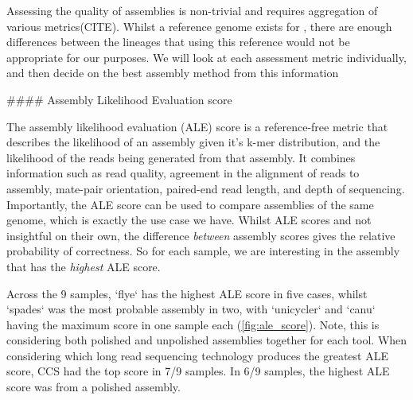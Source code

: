 \begin{markdown}
Assessing the quality of \denovo{} assemblies is non-trivial and requires aggregation of various metrics(CITE). Whilst a reference genome exists for \mtb{}, there are enough differences between the lineages that using this reference would not be appropriate for our purposes. We will look at each assessment metric individually, and then decide on the best assembly method from this information

#### Assembly Likelihood Evaluation score

The assembly likelihood evaluation (ALE) score is a reference-free metric that describes the likelihood of an assembly given it's k-mer distribution, and the likelihood of the reads being generated from that assembly. It combines information such as read quality, agreement in the alignment of reads to assembly, mate-pair orientation, paired-end read length, and depth of sequencing. Importantly, the ALE score can be used to compare assemblies of the same genome, which is exactly the use case we have. Whilst ALE scores and not insightful on their own, the difference \textit{between} assembly scores gives the relative probability of correctness. So for each sample, we are interesting in the assembly that has the \textit{highest} ALE score.  

Across the 9 samples, `flye` has the highest ALE score in five cases, whilst `spades` was the most probable assembly in two, with `unicycler` and `canu` having the maximum score in one sample each (\autoref{fig:ale_score}). Note, this is considering both polished and unpolished assemblies together for each tool. When considering which long read sequencing technology produces the greatest ALE score, CCS had the top score in 7/9 samples. In 6/9 samples, the highest ALE score was from a polished assembly.

\end{markdown}

